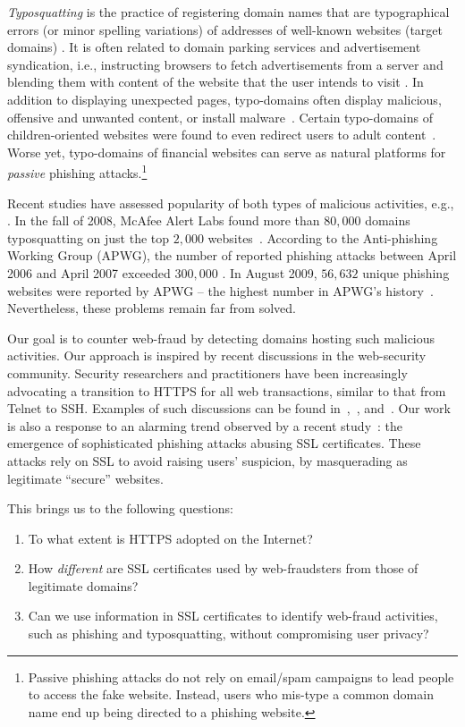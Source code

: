 \documentclass[twocolumn]{article}
\begin{document}
\emph{Typosquatting} is the practice of registering domain names that
are typographical errors (or minor spelling variations) of addresses of well-known
websites (target domains) \cite{Wang}. 
It is often related to domain parking services and advertisement syndication, i.e., instructing browsers 
to fetch advertisements from a server and blending them with content of the
website that the user intends to visit \cite{Wang}. In addition to displaying 
unexpected pages, typo-domains often display malicious, offensive and
unwanted content, or install malware~\cite{googkle,NDSS}. Certain typo-domains of 
children-oriented websites were found to even redirect users to adult content~\cite{microsoft}. Worse 
yet, typo-domains of financial websites can serve as natural
platforms for {\em passive} phishing attacks.\footnote{Passive phishing attacks do not rely on 
email/spam campaigns to lead people to access the fake website. Instead, users 
who mis-type a common domain name end up being directed to a phishing website.}

Recent studies have assessed popularity of both types of malicious activities, e.g., 
\cite{Sturgeon,spamscatter}.  In the fall of 2008, McAfee Alert
Labs found more than $80,000$ domains typosquatting on just the top $2,000$
websites~\cite{mcafee}. According to the Anti-phishing Working Group (APWG),
 the number of reported phishing attacks between April 2006 and April
2007 exceeded $300,000$ \cite{april07}. In  August 2009, $56,632$
unique phishing websites were reported by APWG -- the highest number in APWG's history~\cite{q3}.
Nevertheless, these problems remain far from solved. 

Our goal is to counter web-fraud by detecting domains hosting such malicious activities.
Our approach is inspired by recent discussions in the web-security community. 
Security researchers and practitioners have been increasingly advocating a transition to 
HTTPS for all web transactions, similar to that from Telnet to SSH. 
Examples of such discussions can be found in~\cite{Weaver},~\cite{Lauren}, and~\cite{httpseverywhere}. 
Our work is also a response to an alarming trend observed by a recent study~\cite{symmantec-blog}: 
the emergence of sophisticated phishing attacks abusing SSL certificates. These attacks rely on SSL 
to avoid raising users' suspicion, by masquerading as  legitimate ``secure'' websites. 

This brings us to the following questions:
\begin{enumerate}
\item To what extent is HTTPS adopted on the Internet?
\item How \emph{different} are SSL certificates used by web-fraudsters from those of legitimate domains?
\item Can we use information in SSL certificates to identify web-fraud activities, such as phishing and typosquatting, without compromising user privacy?
\end{enumerate}
\end{document}
